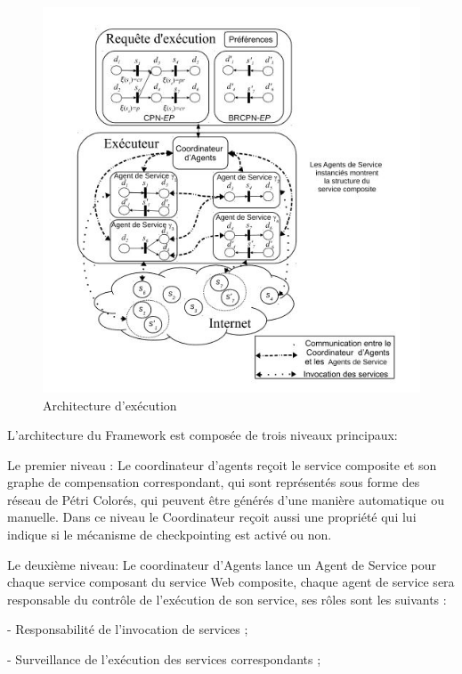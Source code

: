 \begin{figure}[H]
\begin{center}
\includegraphics[width=1\linewidth]{images/architectureFrmwork.jpg}
\end{center}
\caption{Architecture d'exécution \cite{1}}
\label{fig:4}
\end{figure}


L’architecture du Framework est composée de trois niveaux principaux:

Le premier niveau : Le coordinateur d’agents reçoit le service composite et son graphe de compensation correspondant, qui sont représentés sous forme des réseau de Pétri Colorés, qui peuvent être générés d'une manière automatique ou manuelle.
Dans ce niveau le Coordinateur reçoit aussi une propriété qui lui indique si le mécanisme de checkpointing est activé ou non.

Le deuxième niveau: Le coordinateur d'Agents lance un Agent de Service pour chaque service composant du service Web composite, chaque agent de service sera responsable du contrôle de l'exécution de son service, ses rôles sont les suivants \cite{1}:

    - Responsabilité de l'invocation de services ;

    - Surveillance de l'exécution des services correspondants ;
    
